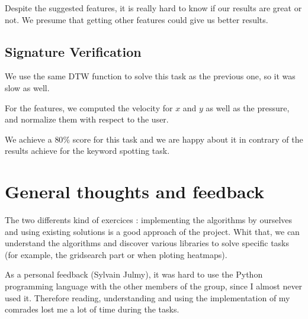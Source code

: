 \documentclass[a4paper,11pt]{report}
\begin{document}
Despite the suggested features, it is really hard to know if our results are
great or not. We presume that getting other features could give us better
results.

\subsection*{Signature Verification}

We use the same DTW function to solve this task as the previous one, so it was
slow as well.

For the features, we computed the velocity for $x$ and $y$ as well as the
pressure, and normalize them with respect to the user.

We achieve a $80\%$ score for this task and we are happy about it in contrary of
the results achieve for the keyword spotting task.

\section*{General thoughts and feedback}

The two differents kind of exercices : implementing the algorithms by ourselves and using
existing solutions is a good approach of the project. Whit that, we can
understand the algorithms and discover various libraries to solve specific tasks
(for example, the gridsearch part or when ploting heatmaps).

As a personal feedback (Sylvain Julmy), it was hard to use the Python
programming language with the other members of the group, since I almost never
used it. Therefore reading, understanding and using the implementation of my
comrades lost me a lot of time during the tasks.
\end{document}
